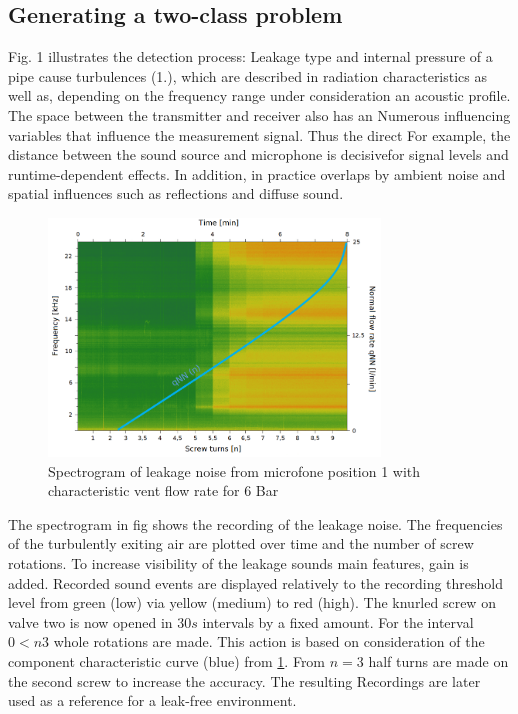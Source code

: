 \documentclass[a4paper,12pt]{article}
\begin{document}
\subsection{Generating a two-class problem}

Fig. 1 illustrates the detection process: Leakage type and internal pressure of a pipe cause turbulences (1.), which are described in radiation characteristics as well as, depending on the frequency range under consideration an acoustic profile. The space between the transmitter and receiver also has an Numerous influencing variables that influence the measurement signal. Thus the direct For example, the distance between the sound source and microphone is decisivefor signal levels and runtime-dependent effects. In addition, in practice overlaps by ambient noise and spatial influences such as reflections and diffuse sound.

\begin{figure}[h]
	\centering
	\includegraphics[width=88mm]{images/V_1_normi_qnn.png}
	\caption{Spectrogram of leakage noise from microfone position 1 with characteristic vent flow rate for 6 Bar}
	\label{fig:spec+qnn}
\end{figure}

The spectrogram in fig shows the recording of the leakage noise. The frequencies of the turbulently exiting air are plotted over time and the number of screw rotations. To increase visibility of the leakage sounds main features, gain is added. Recorded sound events are displayed relatively to the recording threshold level from green (low) via yellow (medium) to red (high). The knurled screw on valve two is now opened in $30s$ intervals by a fixed amount. For the interval $0 < n  3$ whole rotations are made. This action is based on consideration of the component characteristic curve (blue) from \ref{fig:spec+qnn}. From $n = 3$ half turns are made on the second screw to increase the accuracy. The resulting Recordings are later used as a reference for a leak-free environment.
\end{document}
